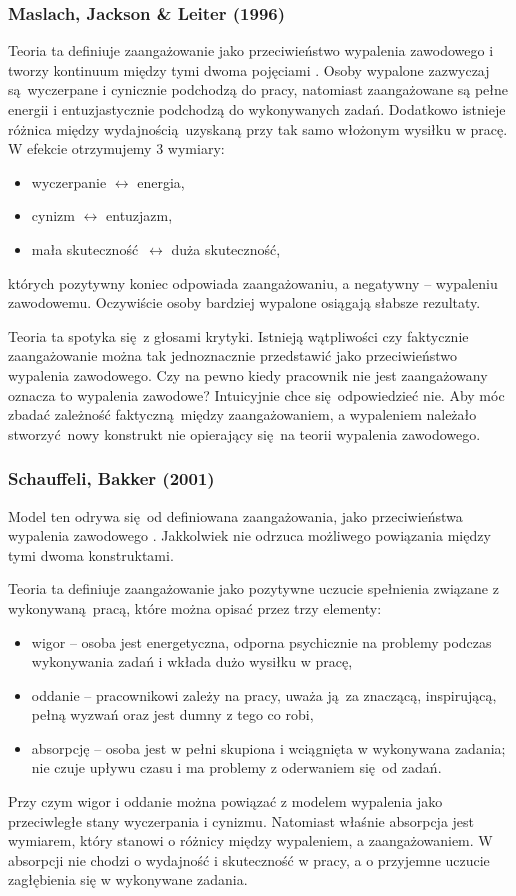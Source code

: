 \subsubsection{Maslach, Jackson \& Leiter (1996)}
\label{sec:model-maslach}
Teoria ta definiuje zaangażowanie jako przeciwieństwo wypalenia zawodowego i tworzy kontinuum między tymi dwoma pojęciami \citep{maslach1997truth}. Osoby wypalone zazwyczaj są wyczerpane i cynicznie podchodzą do pracy, natomiast zaangażowane są pełne energii i entuzjastycznie podchodzą do wykonywanych zadań. Dodatkowo istnieje różnica między wydajnością uzyskaną przy tak samo włożonym wysiłku w pracę. W efekcie otrzymujemy 3 wymiary:
\begin{itemize}
\item wyczerpanie $\leftrightarrow$ energia,
\item cynizm $\leftrightarrow$ entuzjazm,
\item mała skuteczność $\leftrightarrow$ duża skuteczność,
\end{itemize}
których pozytywny koniec odpowiada zaangażowaniu, a negatywny -- wypaleniu zawodowemu. Oczywiście osoby bardziej wypalone osiągają słabsze rezultaty.

Teoria ta spotyka się z głosami krytyki. Istnieją wątpliwości czy faktycznie zaangażowanie można tak jednoznacznie przedstawić jako przeciwieństwo wypalenia zawodowego. Czy na pewno kiedy pracownik nie jest zaangażowany oznacza to wypalenia zawodowe? Intuicyjnie chce się odpowiedzieć nie. Aby móc zbadać zależność faktyczną między zaangażowaniem, a wypaleniem należało stworzyć nowy konstrukt nie opierający się na teorii wypalenia zawodowego.

\subsubsection{Schauffeli, Bakker (2001)}
\label{sec:model-schauffeli}
Model ten odrywa się od definiowana zaangażowania, jako przeciwieństwa wypalenia zawodowego \citep{schaufeli2002measurement}. Jakkolwiek nie odrzuca możliwego powiązania między tymi dwoma konstruktami. 

Teoria ta definiuje zaangażowanie jako pozytywne uczucie spełnienia związane z wykonywaną pracą, które można opisać przez trzy elementy:
\begin{itemize}
\item wigor -- osoba jest energetyczna, odporna psychicznie na problemy podczas wykonywania zadań i wkłada dużo wysiłku w pracę,
\item oddanie -- pracownikowi zależy na pracy, uważa ją za znaczącą, inspirującą, pełną wyzwań oraz jest dumny z tego co robi,
\item absorpcję -- osoba jest w pełni skupiona i wciągnięta w wykonywana zadania; nie czuje upływu czasu i ma problemy z oderwaniem się od zadań.
\end{itemize}
Przy czym wigor i oddanie można powiązać z modelem wypalenia jako przeciwległe stany wyczerpania i cynizmu. Natomiast właśnie absorpcja jest wymiarem, który stanowi o różnicy między wypaleniem, a zaangażowaniem. W absorpcji nie chodzi o wydajność i skuteczność w pracy, a o przyjemne uczucie zagłębienia się w wykonywane zadania.

